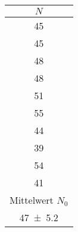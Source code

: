 \begin{tabular}{c}
\toprule
{$N$} \\
\midrule
 45   \\
 45   \\
 48   \\
 48   \\
 51   \\
 55   \\
 44   \\
 39   \\
 54   \\
 41   \\
\midrule
{Mittelwert $N_0$} \\
\num{47 +- 5.2} \\
\bottomrule
\end{tabular}
